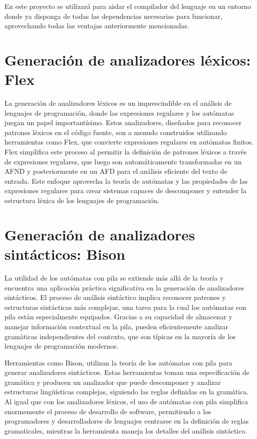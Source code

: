 En este proyecto se utilizará para aislar el compilador del lenguaje en un entorno donde ya disponga de todas las dependencias necesarias para funcionar, aprovechando todas las ventajas anteriormente mencionadas.

\section{Generación de analizadores léxicos: Flex}
La generación de analizadores léxicos es un imprescindible en el análisis de lenguajes de programación, donde las expresiones regulares y los autómatas juegan un papel importantísimo. Estos analizadores, diseñados para reconocer patrones léxicos en el código fuente, son a menudo construidos utilizando herramientas como Flex, que convierte expresiones regulares en autómatas finitos. Flex simplifica este proceso al permitir la definición de patrones léxicos a través de expresiones regulares, que luego son automáticamente transformadas en un AFND y posteriormente en un AFD para el análisis eficiente del texto de entrada. Este enfoque aprovecha la teoría de autómatas y las propiedades de las expresiones regulares para crear sistemas capaces de descomponer y entender la estructura léxica de los lenguajes de programación.


\section{Generación de analizadores sintácticos: Bison}
La utilidad de los autómatas con pila se extiende más allá de la teoría y encuentra una aplicación práctica significativa en la generación de analizadores sintácticos. El proceso de análisis sintáctico implica reconocer patrones y estructuras sintácticas más complejas, una tarea para la cual los autómatas con pila están especialmente equipados. Gracias a su capacidad de almacenar y manejar información contextual en la pila, pueden eficientemente analizar gramáticas independientes del contexto, que son típicas en la mayoría de los lenguajes de programación modernos.

Herramientas como Bison, utilizan la teoría de los autómatas con pila para generar analizadores sintácticos. Estas herramientas toman una especificación de gramática y producen un analizador que puede descomponer y analizar estructuras lingüísticas complejas, siguiendo las reglas definidas en la gramática. Al igual que con los analizadores léxicos, el uso de autómatas con pila simplifica enormemente el proceso de desarrollo de software, permitiendo a los programadores y desarrolladores de lenguajes centrarse en la definición de reglas gramaticales, mientras la herramienta maneja los detalles del análisis sintáctico.

